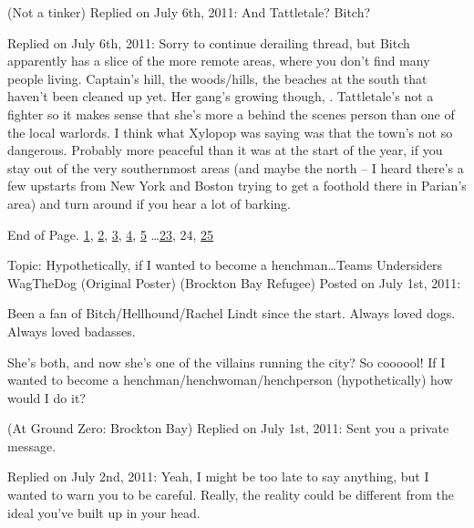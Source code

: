\blacktriangleright {} (Not a tinker)
Replied on July 6th, 2011:
And Tattletale?  Bitch?



\blacktriangleright {}
Replied on July 6th, 2011:
Sorry to continue derailing thread, but Bitch apparently has a slice of the more remote areas, where you don't find many people living.  Captain's hill, the woods/hills, the beaches at the south that haven't been cleaned up yet.  Her gang's growing though, \underline{}.  Tattletale's not a fighter so it makes sense that she's more a behind the scenes person than one of the local warlords.  I think what Xylopop was saying was that the town's not so dangerous.  Probably more peaceful than it was at the start of the year, if you stay out of the very southernmost areas (and maybe the north – I heard there's a few upstarts from New York and Boston trying to get a foothold there in Parian's area) and turn around if you hear a lot of barking.



End of Page.   \underline{1}, \underline{2}, \underline{3}, \underline{4}, \underline{5} \ldots \underline{23}, 24, \underline{25}



\sectionbreak



\blacklozenge  Topic:  Hypothetically, if I wanted to become a henchman\ldots{}\blacktriangleright Teams \blacktriangleright Undersiders
WagTheDog (Original Poster) (Brockton Bay Refugee)
Posted on July 1st, 2011:



Been a fan of Bitch/Hellhound/Rachel Lindt since the start.  Always loved dogs.  Always loved badasses.



She's both, and now she's one of the villains running the city?  So coooool!  If I wanted to become a henchman/henchwoman/henchperson (hypothetically) how would I do it?



\blacktriangleright  {}(At Ground Zero: Brockton Bay)
Replied on July 1st, 2011:
Sent you a private message.



\blacktriangleright  {}
Replied on July 2nd, 2011:
Yeah, I might be too late to say anything, but I wanted to warn you to be careful.  Really, the reality could be different from the ideal you've built up in your head.




